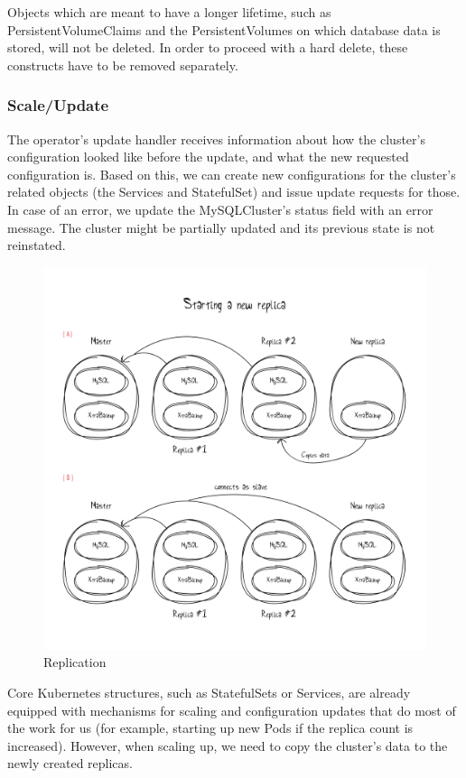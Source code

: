 Objects which are meant to have a longer lifetime, such as PersistentVolumeClaims and the
PersistentVolumes on which database data is stored, will not be deleted. In order to
proceed with a hard delete, these constructs have to be removed separately.

\subsubsection*{Scale/Update}
The operator’s update handler receives information about how the cluster’s configuration looked
like before the update, and what the new requested configuration is. Based on this, we can create
new configurations for the cluster’s related objects (the Services and StatefulSet) and issue update
requests for those. In case of an error, we update the MySQLCluster’s status field with an error
message. The cluster might be partially updated and its previous state is not reinstated.

\begin{figure}[!ht]
    \centering
    \includegraphics[width=1\textwidth, angle=0]{img/Replication.pdf}
    \caption{Replication}
    \label{fig:replication}
\end{figure}

Core Kubernetes structures, such as StatefulSets or Services, are already equipped with mechanisms
for scaling and configuration updates that do most of the work for us (for example, starting up new
Pods if the replica count is increased). However, when scaling up, we need to copy the cluster’s
data to the newly created replicas.

